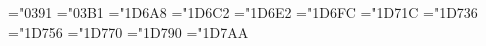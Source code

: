 \protected{}
\protected{}
\protected{}
\protected{}
\protected{}
\protected{}
\protected{}
\protected{}
\protected{}
\protected{}
\protected{}
\protected{}
\protected{}
\protected{}

\chardef\greekrmA="0391   \chardef\greekrma="03B1
\chardef\greekbfA="1D6A8  \chardef\greekbfa="1D6C2
\chardef\greekitA="1D6E2  \chardef\greekita="1D6FC
\chardef\greekbiA="1D71C  \chardef\greekbia="1D736
\chardef\greeksnA="1D756  \chardef\greeksna="1D770
\chardef\greeksiA="1D790  \chardef\greeksia="1D7AA

\protected\def\nitgreek{%
   \umathrangeGREEK\greekrmA \umathfixgreekromanuppercase
   \umathrangegreek\greekita
}
\protected\def\rmgreek{%
   \umathrangeGREEK\greekrmA \umathfixgreekromanuppercase
   \umathrangegreek\greekrma \umathfixgreekromanlowercase
}
\protected\def\bfgreek    {\umathrangeGREEK\greekbfA \umathrangegreek\greekbfa}
\protected\def\bigreek    {\umathrangeGREEK\greekbfA \umathrangegreek\greekbia}
\protected\def\sansgreek  {\umathrangeGREEK\greeksnA \umathrangegreek\greeksna}
\protected\def\isansgreek {\umathrangeGREEK\greeksnA \umathrangegreek\greeksia}


